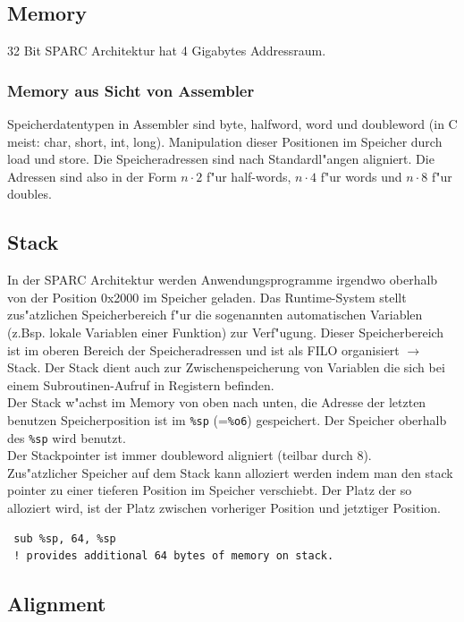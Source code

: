 \documentclass[german, 10pt, a4paper, twocolumn]{scrartcl}
\begin{document}
\subsection{Memory}

32 Bit SPARC Architektur hat 4 Gigabytes Addressraum.

\subsubsection{Memory aus Sicht von Assembler}

Speicherdatentypen in Assembler sind byte, halfword, word und doubleword (in C meist: char, short, int, long). Manipulation dieser Positionen im Speicher durch load und store. Die Speicheradressen sind nach Standardl"angen aligniert. Die Adressen sind also in der Form $n\cdotp2$ f"ur half-words, $n\cdotp4$ f"ur words und $n\cdotp 8$ f"ur doubles.

\subsection{Stack}

In der SPARC Architektur werden Anwendungsprogramme irgendwo oberhalb von der Position 0x2000 im Speicher geladen. Das Runtime-System stellt zus"atzlichen Speicherbereich f"ur die sogenannten automatischen Variablen (z.Bsp. lokale Variablen einer Funktion) zur Verf"ugung. Dieser Speicherbereich ist im oberen Bereich der Speicheradressen und ist als FILO organisiert $\rightarrow$ Stack. Der Stack dient auch zur Zwischenspeicherung von Variablen die sich bei einem Subroutinen-Aufruf in Registern befinden.\\
Der Stack w"achst im Memory von oben nach unten, die Adresse der letzten benutzen Speicherposition ist im \verb#%sp# (=\verb#%o6#) gespeichert. Der Speicher oberhalb des \verb#%sp# wird benutzt.\\
Der Stackpointer ist immer doubleword aligniert (teilbar durch 8).\\
Zus"atzlicher Speicher auf dem Stack kann alloziert werden indem man den stack pointer zu einer tieferen Position im Speicher verschiebt. Der Platz der so alloziert wird, ist der Platz zwischen vorheriger Position und jetztiger Position.
\begin{verbatim}
 sub %sp, 64, %sp
 ! provides additional 64 bytes of memory on stack.
\end{verbatim}

\subsection{Alignment}
\end{document}
